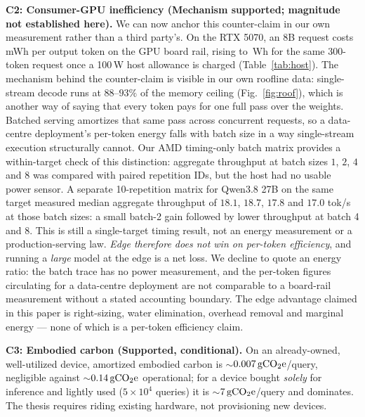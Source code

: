 \documentclass[conference]{IEEEtran}
\newcommand{\gco}{\,\text{gCO\textsubscript{2}e}}
\begin{document}
\textbf{C2: Consumer-GPU inefficiency (Mechanism supported; magnitude not
established here).} We can now anchor this counter-claim in our own measurement
rather than a third party's. On the RTX 5070, an 8B request costs
\RtxEightMilliWh{}\,mWh per output token on the GPU board rail, rising to
\RtxEightHostHundred{}\,Wh for the same 300-token request once a 100\,W host
allowance is charged (Table~\ref{tab:host}). The mechanism behind the
counter-claim is visible in our own roofline data: single-stream decode runs at
$88$--$93\%$ of the memory ceiling (Fig.~\ref{fig:roof}), which is another way
of saying that every token pays for one full pass over the weights. Batched
serving amortizes that same pass across concurrent requests, so a data-centre
deployment's per-token energy falls with batch size in a way single-stream
execution structurally cannot. Our AMD timing-only batch matrix provides a
within-target check of this distinction: aggregate throughput at batch sizes
$1$, $2$, $4$ and $8$ was compared with paired repetition IDs, but the host had
no usable power sensor. A separate 10-repetition matrix for Qwen3.8 27B on the
same target measured median aggregate throughput of $18.1$, $18.7$, $17.8$ and
$17.0$ tok/s at those batch sizes: a small batch-2 gain followed by lower
throughput at batch 4 and 8. This is still a single-target timing result, not
an energy measurement or a production-serving law. \emph{Edge therefore does not win on per-token
efficiency}, and running a \emph{large} model at the edge is a net loss. We
decline to quote an energy ratio: the batch trace has no power measurement, and
the per-token figures circulating for a data-centre deployment are not
comparable to a board-rail measurement without a stated accounting boundary.
The edge advantage claimed in this paper is right-sizing, water elimination,
overhead removal and marginal energy --- none of which is a per-token efficiency
claim.

\textbf{C3: Embodied carbon (Supported, conditional).} On an already-owned,
well-utilized device, amortized embodied carbon is $\sim$$0.007\gco$/query,
negligible against $\sim$$0.14\gco$ operational; for a device bought \emph{solely}
for inference and lightly used ($5{\times}10^4$ queries) it is $\sim$$7\gco$/query
and dominates. The thesis requires riding existing hardware, not provisioning new
devices.
\end{document}
